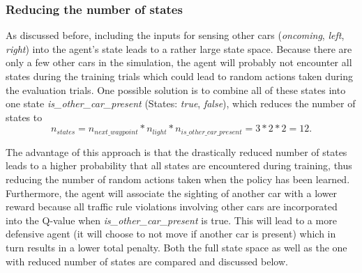 \documentclass[11pt]{article}
\begin{document}
\subsubsection{Reducing the number of states}
As discussed before, including the inputs for sensing other cars (\textit{oncoming}, \textit{left}, \textit{right}) into the agent's state
leads to a rather large state space. Because there are only a few other cars in the simulation, the agent will probably not encounter all states during the training trials which could lead to random actions taken during the evaluation trials. One possible solution is to combine all of these states into one state \textit{is\_other\_car\_present} (States: \textit{true}, \textit{false}), which reduces the number of states to 
\begin{equation}
n_{states} = n_{next\_waypoint} * n_{light} * n_{is\_other\_car\_present} = 3 * 2 * 2 = 12.
\end{equation}

The advantage of this approach is that the drastically reduced number of states leads to a higher probability that all states are encountered during training, thus reducing the number of random actions taken when the policy has been learned. Furthermore, the agent
will associate the sighting of another car with a lower reward because all traffic rule violations involving other cars are incorporated into the Q-value when \textit{is\_other\_car\_present} is true. This will lead to a more defensive agent (it will choose to not move if another car is present) which in turn results in a lower total penalty.
Both the full state space as well as the one with reduced number of states are compared and discussed below.
\end{document}
